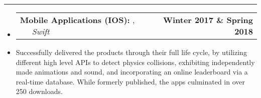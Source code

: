 \documentclass[10pt,letterpaper]{article}
\makeatletter
\newcommand{\header}[2]
{
	\begin{tabular*}{\linewidth}{l @{\extracolsep{\fill}} r}
		\hspace{-27pt} #1 & #2 \\
	\end{tabular*}
}
\makeatother
\begin{document}
\hrule

\begin{itemize}
	\item[]
		\header
		{
			\textbf{Mobile Applications (IOS): }
			\href{https://appadvice.com/app/round-bound/1369632746}{\emph{\underline{\smash{Round 'a Bound}}}}, 
			\href{https://appadvice.com/app/tic-tac-emoji/1346934986}{\emph{\underline{\smash{Tic-Tac Emoji}}}} \ \ \ \footnotesize  \emph{Swift}
		}
		{\textbf{Winter 2017 \& Spring 2018}}
	\item 
		Successfully delivered the products through their full life cycle, by utilizing different high level APIs to detect physics collisions, exhibiting independently made animations and sound, and incorporating an online leaderboard via a real-time database. While formerly published, the apps culminated in over 250 downloads.
\end{itemize}
\end{document}

